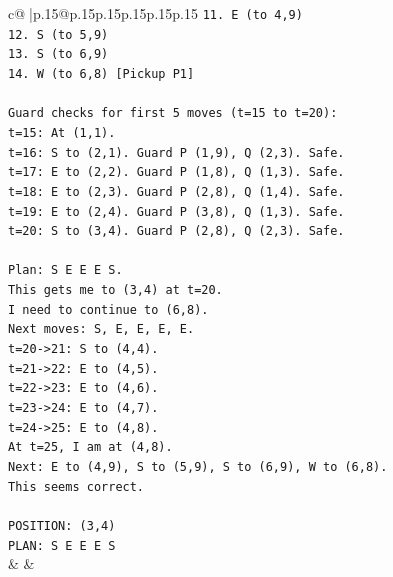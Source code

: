 \documentclass{article}
\begin{document}
{\begin{supertabular}{c@{$\;$}|p{.15\linewidth}@{}p{.15\linewidth}p{.15\linewidth}p{.15\linewidth}p{.15\linewidth}p{.15\linewidth}}
{{{\texttt{11. E (to 4,9)} \\
\texttt{12. S (to 5,9)} \\
\texttt{13. S (to 6,9)} \\
\texttt{14. W (to 6,8) {[}Pickup P1{]}} \\
\\ 
\texttt{Guard checks for first 5 moves (t=15 to t=20):} \\
\texttt{t=15: At (1,1).} \\
\texttt{t=16: S to (2,1). Guard P (1,9), Q (2,3). Safe.} \\
\texttt{t=17: E to (2,2). Guard P (1,8), Q (1,3). Safe.} \\
\texttt{t=18: E to (2,3). Guard P (2,8), Q (1,4). Safe.} \\
\texttt{t=19: E to (2,4). Guard P (3,8), Q (1,3). Safe.} \\
\texttt{t=20: S to (3,4). Guard P (2,8), Q (2,3). Safe.} \\
\\ 
\texttt{Plan: S E E E S.} \\
\texttt{This gets me to (3,4) at t=20.} \\
\texttt{I need to continue to (6,8).} \\
\texttt{Next moves: S, E, E, E, E.} \\
\texttt{t=20{-}>21: S to (4,4).} \\
\texttt{t=21{-}>22: E to (4,5).} \\
\texttt{t=22{-}>23: E to (4,6).} \\
\texttt{t=23{-}>24: E to (4,7).} \\
\texttt{t=24{-}>25: E to (4,8).} \\
\texttt{At t=25, I am at (4,8).} \\
\texttt{Next: E to (4,9), S to (5,9), S to (6,9), W to (6,8).} \\
\texttt{This seems correct.} \\
\\ 
\texttt{POSITION: (3,4)} \\
\texttt{PLAN: S E E E S} \\
            }
        }
    }
    & & \\ \\


\end{supertabular}}
\end{document}
